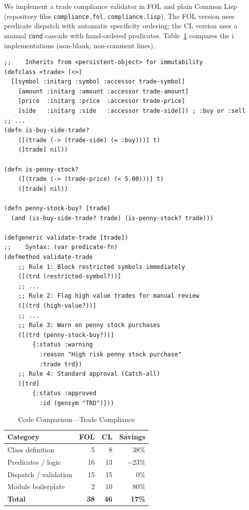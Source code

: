 \documentclass[sigconf,nonacm,review]{acmart}
\begin{document}
We implement a trade compliance validator in FOL and plain
Common Lisp (repository files \texttt{compliance.fol}, \texttt{compliance.lisp}).
The FOL version uses predicate dispatch with automatic
specificity ordering; the CL version uses a manual \texttt{cond} cascade
with hand-ordered predicates. Table~\ref{tab:density} compares the i
implementations (non-blank, non-comment lines).
\begin{lstlisting}
;;    Inherits from <persistent-object> for immutability
(defclass <trade> [<>]
  [[symbol :initarg :symbol :accessor trade-symbol]
    [amount :initarg :amount :accessor trade-amount]
    [price  :initarg :price  :accessor trade-price]
    [side   :initarg :side   :accessor trade-side]]) ; :buy or :sell
;; ...
(defn is-buy-side-trade?
    ([(trade (-> (trade-side) (= :buy)))] t)
    ([trade] nil))

(defn is-penny-stock?
    ([(trade (-> (trade-price) (< 5.00)))] t)
    ([trade] nil))

(defn penny-stock-buy? [trade]
  (and (is-buy-side-trade? trade) (is-penny-stock? trade)))

(defgeneric validate-trade [trade])
;;    Syntax: (var predicate-fn)
(defmethod validate-trade
    ;; Rule 1: Block restricted symbols immediately
    ([(trd (restricted-symbol?))]
    ;; ...
    ;; Rule 2: Flag high value trades for manual review
    ([(trd (high-value?))]
    ;; ...
    ;; Rule 3: Warn on penny stock purchases
    ([(trd (penny-stock-buy?))]
        {:status :warning
          :reason "High risk penny stock purchase"
          :trade trd})
    ;; Rule 4: Standard approval (Catch-all)
    ([trd]
        {:status :approved
          :id (gensym "TRD")}))
\end{lstlisting}

\begin{table}[htbp]
\caption{Code Comparison---Trade Compliance}
\label{tab:density}
\begin{tabular}{lrrr}
\toprule
\textbf{Category} & \textbf{FOL} & \textbf{CL} & \textbf{Savings} \\
\midrule
Class definition & 5 & 8 & 38\% \\
Predicates / logic & 16 & 13 & $-$23\% \\
Dispatch / validation & 15 & 15 & 0\% \\
Module boilerplate & 2 & 10 & 80\% \\
\textbf{Total} & \textbf{38} & \textbf{46} & \textbf{17\%} \\
\bottomrule
\end{tabular}
\end{table}
\end{document}
